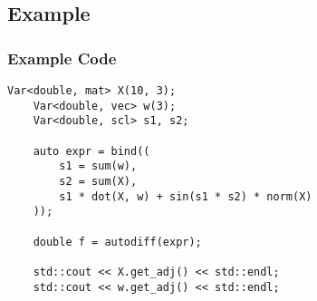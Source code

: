 \subsection{Example}
\frame{\tableofcontents[currentsubsection]}

\begin{frame}[fragile]
\frametitle{Example Code}
\begin{lstlisting}[style=customcpp]
    Var<double, mat> X(10, 3);
    Var<double, vec> w(3);
    Var<double, scl> s1, s2;

    auto expr = bind((
        s1 = sum(w),
        s2 = sum(X),
        s1 * dot(X, w) + sin(s1 * s2) * norm(X)
    ));

    double f = autodiff(expr);

    std::cout << X.get_adj() << std::endl;
    std::cout << w.get_adj() << std::endl;
\end{lstlisting}
\end{frame}
